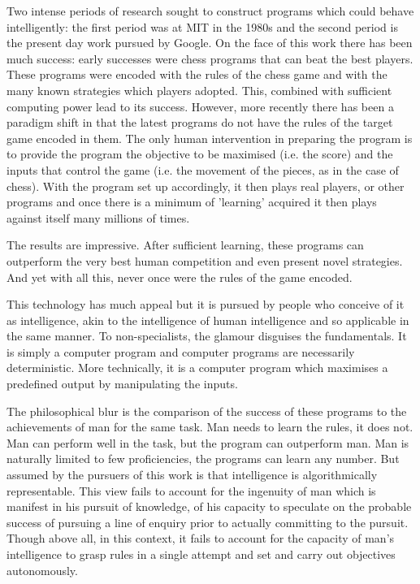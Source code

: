 \documentclass{article}
\begin{document}
Two intense periods of research sought to construct programs which could behave intelligently: the first period was at MIT in the 1980s and the second period is the present day work pursued by Google. On the face of this work there has been much success: early successes were chess programs that can beat the best players. These programs were encoded with the rules of the chess game and with the many known strategies which players adopted. This, combined with sufficient computing power lead to its success. However, more recently there has been a paradigm shift in that the latest programs do not have the rules of the target game encoded in them. The only human intervention in preparing the program is to provide the program the objective to be maximised (i.e. the score) and the inputs that control the game (i.e. the movement of the pieces, as in the case of chess). With the program set up accordingly, it then plays real players, or other programs and once there is a minimum of 'learning' acquired it then plays against itself many millions of times.

The results are impressive. After sufficient learning, these programs can outperform the very best human competition and even present novel strategies. And yet with all this, never once were the rules of the game encoded.

This technology has much appeal but it is pursued by people who conceive of it as intelligence, akin to the intelligence of human intelligence and so applicable in the same manner. To non-specialists, the glamour disguises the fundamentals. It is simply a computer program and computer programs are necessarily deterministic. More technically, it is a computer program which maximises a predefined output by manipulating the inputs.

The philosophical blur is the comparison of the success of these programs to the achievements of man for the same task. Man needs to learn the rules, it does not. Man can perform well in the task, but the program can outperform man. Man is naturally limited to few proficiencies, the programs can learn any number. But assumed by the pursuers of this work is that intelligence is algorithmically representable. This view fails to account for the ingenuity of man which is manifest in his pursuit of knowledge, of his capacity to speculate on the probable success of pursuing a line of enquiry prior to actually committing to the pursuit. Though above all, in this context, it fails to account for the capacity of man's intelligence to grasp rules in a single attempt and set and carry out objectives autonomously.
\end{document}
